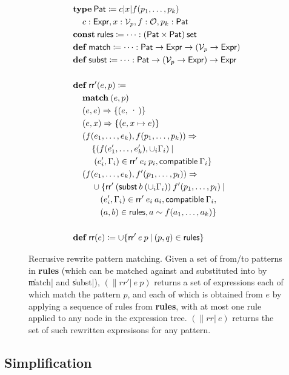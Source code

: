 \documentclass[paper.tex]{subfiles}
\begin{document}
\begin{figure}
\begin{align*}
  &\!type!\:\Pat \ceq c | x | f(p_1, \dotsc, p_k) \\
  &\> c : \Expr, x : \Var_p, f : \Op, p_k : \Pat \\
  &\!const!\:\|rules| \ceq \dotsb : (\Pat \times \Pat)\:\|set| \\
  &\!def!\:\|match| \ceq \dotsb : \Pat \to \Expr \to (\Var_p \to \Expr) \\
  &\!def!\:\|subst| \ceq \dotsb : \Pat \to (\Var_p \to \Expr) \to \Expr \\
  \\
  &\!def!\:\|rr'|(e, p) \ceq \\
  &\> \!match!\:(e, p) \\
  &\>  (e, e) \tto \{ (e, \cdot) \} \\
  &\>  (e, x) \tto \{ (e, x \mapsto e) \} \\
  &\>  (f(e_1, \dotsc, e_k), f(p_1, \dotsc, p_k)) \tto \\
  &\> \> \{ ( f(e_1', \dotsc, e_k'), \cup_i \Gamma_i) \I \\
  &\> \> \; (e_i', \Gamma_i) \in \|rr'|\:e_i\:p_i, \|compatible|\:\Gamma_i \} \\
  &\> (f(e_1, \dotsc, e_k), f'(p_1, \dotsc, p_l)) \tto \\
  &\> \> \cup \{ \|rr'|\:(\|subst|\:b\:(\cup_i \Gamma_i))\:f'(p_1, \dotsc, p_l) \I \\
  &\> \> \quad (e_i', \Gamma_i) \in \|rr'|\:e_i\:a_i, \|compatible|\:\Gamma_i, \\
  &\> \> \quad (a, b) \in \|rules|, a \sim f(a_1, \dotsc, a_k) \} \\
  \\
  &\!def!\:\|rr|(e) \ceq \cup \{ \|rr'|\:e\:p \I (p, q) \in \|rules| \}
\end{align*}
\caption{Recrusive rewrite pattern matching.
  Given a set of from/to patterns in \textbf{rules}
  (which can be matched against and substituted into
  by \|match| and \|subst|),
  $(\|rr'|\:e\:p)$ returns a set of expressions
  each of which match the pattern $p$, and each of which is obtained from $e$
  by applying a sequence of rules from \textbf{rules},
  with at most one rule applied to any node in the expression tree.
  $(\|rr|\:e)$ returns the set of such rewritten expresisons for any pattern.}
\label{alg:rm}
\end{figure}

\subsection{Simplification}
\end{document}
